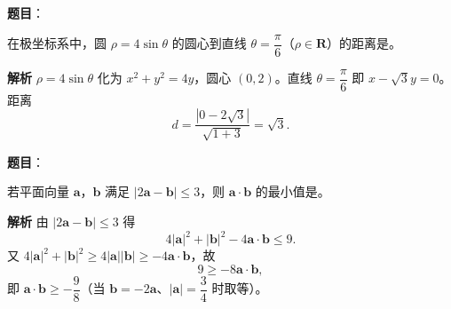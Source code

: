 \begin{answer}

\textbf{题目}：

在极坐标系中，圆 $\rho=4\sin\theta$ 的圆心到直线 $\theta=\dfrac\pi6$（$\rho\in\mathbf R$）的距离是\gkblank{}。

\textbf{解析}
$\rho=4\sin\theta$ 化为 $x^2+y^2=4y$，圆心 $(0,2)$。直线 $\theta=\dfrac\pi6$ 即 $x-\sqrt3y=0$。距离
\nopagebreak[4]
\[d=\frac{|0-2\sqrt3|}{\sqrt{1+3}}=\sqrt3.\]


\end{answer}
\begin{answer}

\textbf{题目}：

若平面向量 $\boldsymbol a$，$\boldsymbol b$ 满足 $|2\boldsymbol a-\boldsymbol b|\leqslant3$，则 $\boldsymbol a\cdot\boldsymbol b$ 的最小值是\gkblank{}。

\textbf{解析}
由 $|2\boldsymbol a-\boldsymbol b|\leqslant3$ 得
\nopagebreak[4]
\[4|\boldsymbol a|^2+|\boldsymbol b|^2-4\boldsymbol a\cdot\boldsymbol b\leqslant9.\]
又 $4|\boldsymbol a|^2+|\boldsymbol b|^2\geqslant4|\boldsymbol a||\boldsymbol b|\geqslant-4\boldsymbol a\cdot\boldsymbol b$，故
\nopagebreak[4]
\[9\geqslant-8\boldsymbol a\cdot\boldsymbol b,\]
即 $\boldsymbol a\cdot\boldsymbol b\geqslant-\dfrac98$（当 $\boldsymbol b=-2\boldsymbol a$、$|\boldsymbol a|=\dfrac34$ 时取等）。


\end{answer}
